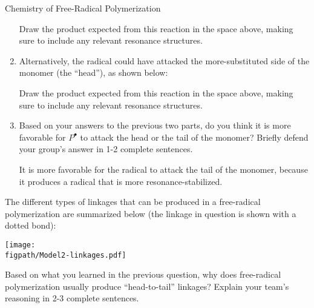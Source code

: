 \begin{activity}{Chemistry of Free-Radical Polymerization}
\begin{ctqs}
\begin{enumerate}
			\begin{solution}[1.2in]\end{solution}
			
				Draw the product expected from this reaction in the space above, making sure to include any relevant resonance structures.
				
				\vspace{12pt}
			\item Alternatively, the radical could have attacked the more-substituted side of the monomer (the ``head''), as shown below:
	
			\begin{solution}[1.2in]\end{solution}
			
				Draw the product expected from this reaction in the space above, making sure to include any relevant resonance structures.
				
				\vspace{12pt}
			\item Based on your answers to the previous two parts, do you think it is more favorable for $P^\bullet$ to attack the head or the tail of the monomer?  Briefly defend your group's answer in 1-2 complete sentences.
				
				\begin{solution}[1.5in]
					It is more favorable for the radical to attack the tail of the monomer, because it produces a radical that is more resonance-stabilized.
				\end{solution}
		\end{enumerate}
		
		\question The different types of linkages that can be produced in a free-radical polymerization are summarized below (the linkage in question is shown with a dotted bond):
	
			\centerline{\texttt{[image: \\figpath/Model2-linkages.pdf]}}
			
				Based on what you learned in the previous question, why does free-radical polymerization usually produce ``head-to-tail'' linkages?  Explain your team's reasoning in 2-3 complete sentences.
				

\end{ctqs}
\end{activity}
